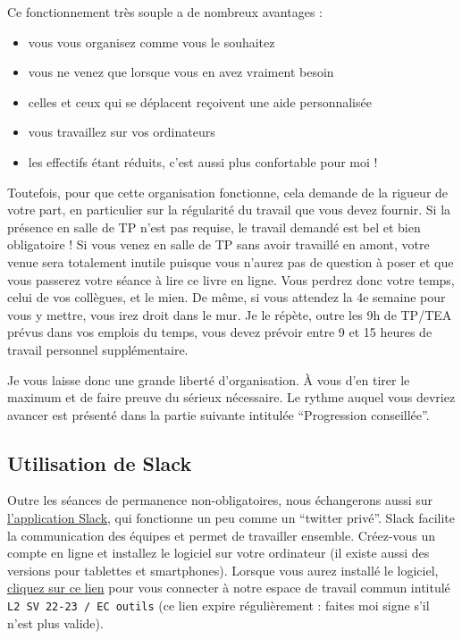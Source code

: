 \documentclass[
  letterpaper,
  DIV=11,
  numbers=noendperiod]{scrreprt}
\providecommand{\tightlist}{%
  \setlength{\itemsep}{0pt}\setlength{\parskip}{0pt}}\usepackage{longtable,booktabs,array}
\begin{document}
Ce fonctionnement très souple a de nombreux avantages :

\begin{itemize}
\tightlist
\item
  vous vous organisez comme vous le souhaitez
\item
  vous ne venez que lorsque vous en avez vraiment besoin
\item
  celles et ceux qui se déplacent reçoivent une aide personnalisée
\item
  vous travaillez sur vos ordinateurs
\item
  les effectifs étant réduits, c'est aussi plus confortable pour moi !
\end{itemize}

Toutefois, pour que cette organisation fonctionne, cela demande de la
rigueur de votre part, en particulier sur la régularité du travail que
vous devez fournir. Si la présence en salle de TP n'est pas requise, le
travail demandé est bel et bien obligatoire ! Si vous venez en salle de
TP sans avoir travaillé en amont, votre venue sera totalement inutile
puisque vous n'aurez pas de question à poser et que vous passerez votre
séance à lire ce livre en ligne. Vous perdrez donc votre temps, celui de
vos collègues, et le mien. De même, si vous attendez la 4e semaine pour
vous y mettre, vous irez droit dans le mur. Je le répète, outre les 9h
de TP/TEA prévus dans vos emplois du temps, vous devez prévoir entre 9
et 15 heures de travail personnel supplémentaire.

Je vous laisse donc une grande liberté d'organisation. À vous d'en tirer
le maximum et de faire preuve du sérieux nécessaire. Le rythme auquel
vous devriez avancer est présenté dans la partie suivante intitulée
``Progression conseillée''.

\hypertarget{utilisation-de-slack}{%
\subsection*{Utilisation de Slack}\label{utilisation-de-slack}}

Outre les séances de permanence non-obligatoires, nous échangerons aussi
sur \href{https://slack.com/intl/fr-fr/}{l'application Slack}, qui
fonctionne un peu comme un ``twitter privé''. Slack facilite la
communication des équipes et permet de travailler ensemble. Créez-vous
un compte en ligne et installez le logiciel sur votre ordinateur (il
existe aussi des versions pour tablettes et smartphones). Lorsque vous
aurez installé le logiciel,
\href{https://join.slack.com/t/l2sv22-23ecoutils/shared_invite/zt-1g7vrl3v7-k_B2D2kMmuRdv_T237Oluw}{cliquez
sur ce lien} pour vous connecter à notre espace de travail commun
intitulé \texttt{L2\ SV\ 22-23\ /\ EC\ outils} (ce lien expire
régulièrement : faites moi signe s'il n'est plus valide).
\end{document}
